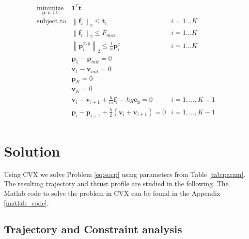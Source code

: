 \documentclass[12pt, letterpaper]{article}
\newcommand{\norm}[1]{\left\lVert#1\right\rVert}
\begin{document}
\begin{equation}
\label{eq:socp}
\begin{array}{lll}
  \underset{\mathbf{p,v,f,t}}{\mbox{minimize}} & \mathbf{1}^T \mathbf{t} & \\
  \mbox{subject to}
    & \norm{\mathbf{f}_i}_2 \leq \mathbf{t}_i & i = 1...K \\
    & \norm{\mathbf{f}_i}_2 \leq F_{max} & i = 1...K \\
    & \norm{\mathbf{p}^{x,y}_i}_2 \leq \frac{1}{\alpha} \mathbf{p}^z_i & i = 1...K \\
    & \mathbf{p}_1 - \mathbf{p}_{init} = 0 & \\
    & \mathbf{v}_1 - \mathbf{v}_{init} = 0 & \\
    & \mathbf{p}_K = 0 & \\
    & \mathbf{v}_K = 0 & \\
    & \mathbf{v}_i - \mathbf{v}_{i+1} + \frac{h}{m} \mathbf{f}_i - hg\mathbf{e_3} = 0 & i = 1,...,K-1 \\
    & \mathbf{p}_i - \mathbf{p}_{i+1} + \frac{h}{2} (\mathbf{v}_i + \mathbf{v}_{i+1}) = 0 & i = 1,...,K-1 \\
\end{array}
\end{equation}

\section{Solution}

Using CVX we solve Problem \ref{eq:socp} using parameters from Table \ref{tab:param}. The resulting trajectory and thrust profile are studied in the following.
The Matlab code to solve the problem in CVX  can be found in the Appendix \ref{matlab_code}.

\subsection{Trajectory and Constraint analysis}
\end{document}

